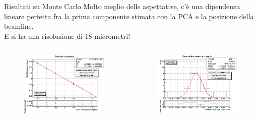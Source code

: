 \documentclass[
10pt,
aspectratio=169,
]{beamer}
\begin{document}
\begin{frame}{Risultati su Monte Carlo}
Molto meglio delle aspettative, c'è una dipendenza lineare perfetta fra la prima componente stimata con la PCA e la posizione della beamline.\\
E si ha una risoluzione di 18 micrometri!
    \begin{columns}
        \begin{figure}
            \centering
            \includegraphics[width=\textwidth]{figures/y_fit_MC.png}
        \end{figure}
        \begin{figure}
            \centering
            \includegraphics[width=\textwidth]{figures/x_res_MC.png}
        \end{figure}
    \end{columns}
\end{frame}
\end{document}
